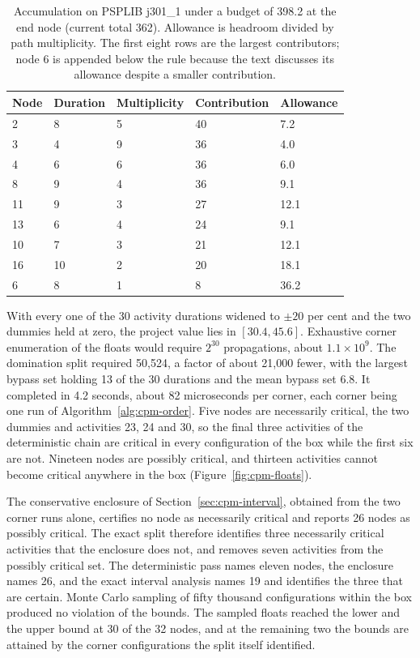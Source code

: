 \documentclass[12pt]{report}
\begin{document}
\begin{table}[htbp]
\centering
\caption{Accumulation on PSPLIB j301\_1 under a budget of 398.2 at the end node (current
total 362). Allowance is headroom divided by path multiplicity. The first eight rows are
the largest contributors; node 6 is appended below the rule because the text discusses its
allowance despite a smaller contribution.}
\label{tab:cpm-psplib-allowance}
\small
\renewcommand{\arraystretch}{1.15}
\begin{tabular}{lllll}
\toprule
Node & Duration & Multiplicity & Contribution & Allowance \\
\midrule
2  & 8  & 5 & 40 & 7.2 \\
3  & 4  & 9 & 36 & 4.0 \\
4  & 6  & 6 & 36 & 6.0 \\
8  & 9  & 4 & 36 & 9.1 \\
11 & 9  & 3 & 27 & 12.1 \\
13 & 6  & 4 & 24 & 9.1 \\
10 & 7  & 3 & 21 & 12.1 \\
16 & 10 & 2 & 20 & 18.1 \\
\midrule
6  & 8  & 1 & 8  & 36.2 \\
\bottomrule
\end{tabular}
\end{table}

With every one of the 30 activity durations widened to $\pm 20$ per cent and the two
dummies held at zero, the project value lies in $[30.4, 45.6]$. Exhaustive corner
enumeration of the floats would require $2^{30}$ propagations, about $1.1 \times 10^{9}$.
The domination split required 50,524, a factor of about 21,000 fewer, with the largest
bypass set holding 13 of the 30 durations and the mean bypass set 6.8. It completed in
4.2 seconds, about 82 microseconds per corner, each corner being one run of
Algorithm~\ref{alg:cpm-order}. Five nodes are necessarily critical,
the two dummies and activities 23, 24 and 30, so the final three activities of the
deterministic chain are critical in every configuration of the box while the first six are
not. Nineteen nodes are possibly critical, and thirteen activities cannot become critical
anywhere in the box (Figure~\ref{fig:cpm-floats}).

The conservative enclosure of Section~\ref{sec:cpm-interval}, obtained from the two corner
runs alone, certifies no node as necessarily critical and reports 26 nodes as possibly
critical. The exact split therefore identifies three necessarily critical activities that the
enclosure does not, and removes seven activities from the possibly critical set. The
deterministic pass names eleven nodes, the enclosure names 26, and the exact interval
analysis names 19 and identifies the three that are certain. Monte Carlo sampling of fifty thousand configurations within the box produced no
violation of the bounds. The sampled floats reached the lower and the upper bound at 30 of
the 32 nodes, and at the remaining two the bounds are attained by the corner configurations
the split itself identified.
\end{document}
